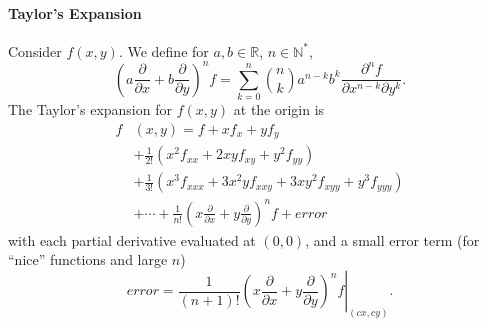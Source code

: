 \paragraph{Taylor's Expansion}
Consider $f\left( x,y \right) $. We define for $a,b\in \mathbb{R}$, $n\in \mathbb{N}^{*}$,
\[{\left( a \frac{\partial}{\partial x} +b \frac{\partial}{\partial y}  \right)
}^{n} f=\sum_{k=0}^{n} \binom{n}{k}a^{n-k}b^{k}\frac{\partial ^{n}f}{\partial
x^{n-k}\partial y^{k}}.\] 
The Taylor's expansion for $f\left( x,y \right) $ at the origin is
\begin{align*}
  f&\left( x,y \right)=f+xf_x+yf_y\\
                     &+\frac{1}{2\mathpunct{!}}\left( x^{2}f_{xx}+2xyf_{xy}+y^{2}f_{yy} \right)\\
                     &+\frac{1}{3\mathpunct{!}}\left( x^{3}f_{xxx}+3x^{2}yf_{xxy}+3xy^{2}f_{xyy}+y^{3}f_{yyy} \right) \\
                     &+\cdots+\frac{1}{n\mathpunct{!}}{\left( x \frac{\partial }{\partial x} +y \frac{\partial }{\partial y}  \right)} ^{n} f+error
\end{align*}
with each partial derivative evaluated at $\left( 0,0 \right) $, and a small
error term (for ``nice'' functions and large $n$)
\[error=\left.\frac{1}{(n+1)\mathpunct{!}}{\left( x \frac{\partial }{\partial
  x} +y \frac{\partial }{\partial y}  \right)} ^{n} f\right|_{\left( cx,cy
\right)}.\]


